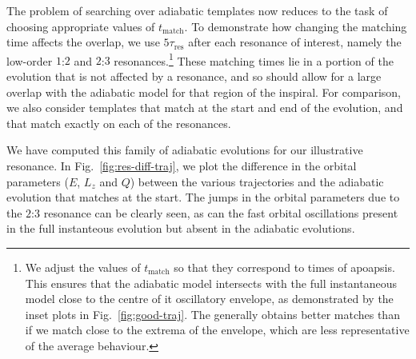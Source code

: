 \documentclass[aps,prd,amsfonts,amssymb,amsmath,nofootinbib,showpacs,superscriptaddress,twocolumn,floatfix]{revtex4-1}
\newcommand{\figref}[1]{Fig.~\ref{fig:#1}}
\newcommand{\sub}[1]{\ensuremath{_\mathrm{#1}}}
\begin{document}

The problem of searching over adiabatic templates now reduces to the task of choosing appropriate values of $t\sub{match}$. To demonstrate how changing the matching time affects the overlap, we use $5\tau\sub{res}$ after each resonance of interest, namely the low-order $1$:$2$ and $2$:$3$ resonances.\footnote{We adjust the values of $t\sub{match}$ so that they correspond to times of apoapsis. This ensures that the adiabatic model intersects with the full instantaneous model close to the centre of it oscillatory envelope, as demonstrated by the inset plots in \figref{good-traj}. The generally obtains better matches than if we match close to the extrema of the envelope, which are less representative of the average behaviour.} These matching times lie in a portion of the evolution that is not affected by a resonance, and so should allow for a large overlap with the adiabatic model for that region of the inspiral. For comparison, we also consider templates that match at the start and end of the evolution, and that match exactly on each of the resonances.


We have computed this family of adiabatic evolutions for our illustrative resonance. In \figref{res-diff-traj}, we plot the difference in the orbital parameters ($E$, $L_z$ and $Q$) between the various trajectories and the adiabatic evolution that matches at the start. The jumps in the orbital parameters due to the $2$:$3$ resonance can be clearly seen, as can the fast orbital oscillations present in the full instanteous evolution but absent in the adiabatic evolutions.
\end{document}

